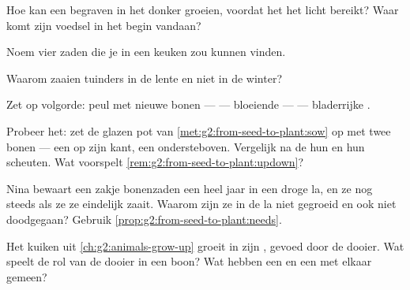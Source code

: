 \begin{exercise}[$\star$]\label{exo:g2:from-seed-to-plant:4}
Hoe kan een begraven  in het donker groeien, voordat het het
licht bereikt? Waar komt zijn voedsel in het begin vandaan?
\end{exercise}

\begin{exercise}[$\star$]\label{exo:g2:from-seed-to-plant:5}
Noem vier zaden die je in een keuken zou kunnen vinden.
\end{exercise}

\begin{exercise}[$\star$]\label{exo:g2:from-seed-to-plant:6}
Waarom zaaien tuinders in de lente en niet in de winter?
\end{exercise}

\begin{exercise}[$\star$]\label{exo:g2:from-seed-to-plant:7}
Zet op volgorde: peul met nieuwe bonen ---  --- bloeiende  ---
 --- bladerrijke .
\end{exercise}

\begin{exercise}[$\star$]\label{exo:g2:from-seed-to-plant:8}
Probeer het: zet de glazen pot van \cref{met:g2:from-seed-to-plant:sow}
op met twee bonen --- een op zijn kant, een ondersteboven. Vergelijk na
de  hun  en hun scheuten. Wat voorspelt
\cref{rem:g2:from-seed-to-plant:updown}?
\end{exercise}

\begin{exercise}[$\star\star$]\label{exo:g2:from-seed-to-plant:9}
Nina bewaart een zakje bonenzaden een heel jaar in een droge la, en ze
 nog steeds als ze ze eindelijk zaait. Waarom zijn ze in de la
niet gegroeid en ook niet doodgegaan? Gebruik
\cref{prop:g2:from-seed-to-plant:needs}.
\end{exercise}

\begin{exercise}[$\star\star$]\label{exo:g2:from-seed-to-plant:10}
Het kuiken uit \cref{ch:g2:animals-grow-up} groeit in zijn , gevoed
door de dooier. Wat speelt de rol van de dooier in een boon? Wat hebben
een  en een  met elkaar gemeen?
\end{exercise}
